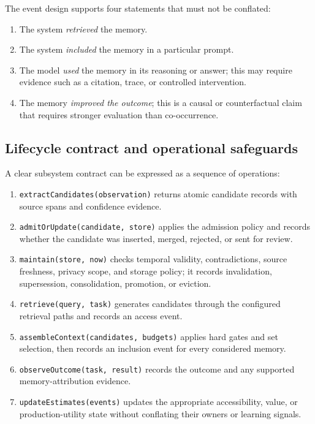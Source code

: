 
The event design supports four statements that must not be conflated:
\begin{enumerate}
  \item The system \emph{retrieved} the memory.
  \item The system \emph{included} the memory in a particular prompt.
  \item The model \emph{used} the memory in its reasoning or answer; this may require evidence such as a citation, trace, or controlled intervention.
  \item The memory \emph{improved the outcome}; this is a causal or counterfactual claim that requires stronger evaluation than co-occurrence.
\end{enumerate}

\subsection{Lifecycle contract and operational safeguards}
\label{subsec:ch12-lifecycle-contract}

A clear subsystem contract can be expressed as a sequence of operations:

\begin{enumerate}
  \item \texttt{extractCandidates(observation)} returns atomic candidate records with source spans and confidence evidence.
  \item \texttt{admitOrUpdate(candidate, store)} applies the admission policy and records whether the candidate was inserted, merged, rejected, or sent for review.
  \item \texttt{maintain(store, now)} checks temporal validity, contradictions, source freshness, privacy scope, and storage policy; it records invalidation, supersession, consolidation, promotion, or eviction.
  \item \texttt{retrieve(query, task)} generates candidates through the configured retrieval paths and records an access event.
  \item \texttt{assembleContext(candidates, budgets)} applies hard gates and set selection, then records an inclusion event for every considered memory.
  \item \texttt{observeOutcome(task, result)} records the outcome and any supported memory-attribution evidence.
  \item \texttt{updateEstimates(events)} updates the appropriate accessibility, value, or production-utility state without conflating their owners or learning signals.
\end{enumerate}

